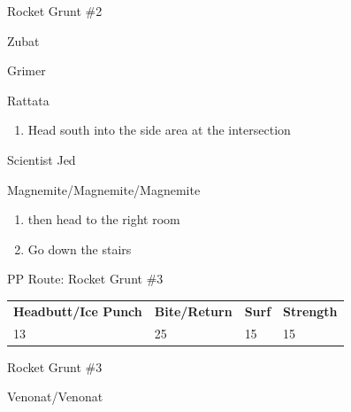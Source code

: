 \begin{paracol}{2}
\begin{trainer}{Rocket Grunt \#2}
	\varwb
	\begin{fightSection}{Zubat}
		\item {} \bite
	\end{fightSection}
	\begin{fightSection}{Grimer}
		\item {} \strength
	\end{fightSection}
	\begin{fightSection}{Rattata}
		\item {} \bite
	\end{fightSection}
	\varwe
\end{trainer}

\begin{enumerate}[resume]
	\item Head south into the side area at the intersection
\end{enumerate}

\begin{trainer}{Scientist Jed}
	\varwb
	\begin{fightSection}{Magnemite/Magnemite/Magnemite}
		\item {} \surf{} 
	\end{fightSection}
	\varwe
\end{trainer}

\begin{enumerate}[resume]
	\item {} then head to the right room
	\item Go down the stairs 
\end{enumerate}

\switchcolumn*
\begin{misc}{PP Route: Rocket Grunt \#3}
	\varwb
	\begin{tabu} to \textwidth {X[6,c] X[5,c] X[4,c] X[4,c]}
		\textbf{Headbutt/Ice Punch} & \textbf{Bite/Return} & \textbf{Surf} & \textbf{Strength}\\ 
		13 & 25 & 15 & 15
	\end{tabu}
	\varwe
\end{misc}

\switchcolumn
\begin{trainer}{Rocket Grunt \#3}
	\varwb
	\begin{fightSection}{Venonat/Venonat}
		\item {}
		\item {} \headbutt{} 
	\end{fightSection}
	\varwe
\end{trainer}


\end{paracol}
